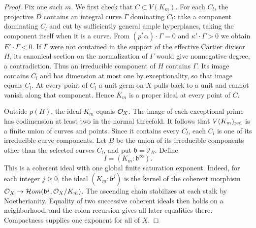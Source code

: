 \begin{proof}
Fix one such \(m\).  We first check that \(C\subset V(K_m)\).
For each \(C_l\), the projective \(D\) contains an integral curve
\(\Gamma\) dominating \(C_l\): take a component dominating \(C_l\)
and cut by sufficiently general ample hyperplanes, taking the component
itself when it is a curve.  From
\((p^*\alpha)\cdot\Gamma=0\) and \(\kappa'\cdot\Gamma>0\) we obtain
\(E'\cdot\Gamma<0\).  If \(\Gamma\) were not contained in the support
of the effective Cartier divisor \(H\), its canonical section on the
normalization of \(\Gamma\) would give nonnegative degree, a contradiction.
Thus an irreducible component of \(H\) contains \(\Gamma\).  Its image
contains \(C_l\) and has dimension at most one by exceptionality, so
that image equals \(C_l\).  At every
point of \(C_l\) a unit germ on \(X\) pulls back to a unit and cannot
vanish along that component.  Hence \(K_m\) is a proper ideal at every
point of \(C\).

Outside \(p(H)\), the ideal \(K_m\) equals \(\mathcal O_X\).  The image of each
exceptional prime has codimension at least two in the normal threefold.
It follows that \(V(K_m)_{\mathrm{red}}\) is a finite union of curves and points.
Since it contains every \(C_l\), each \(C_l\) is one of its irreducible
curve components.
Let \(B\) be the union of its irreducible components other than the
selected curves \(C_l\), and put \(\mathfrak b=\mathcal I_B\).  Define
\[
 I=(K_m:\mathfrak b^\infty).
\]
This is a coherent ideal with one global finite saturation exponent.
Indeed, for each integer \(j\geq0\), the ideal
\((K_m:\mathfrak b^j)\) is the kernel of the coherent
morphism
\(\mathcal O_X\to\mathcal Hom(\mathfrak b^j,\mathcal O_X/K_m)\).
The ascending chain stabilizes at each stalk by Noetherianity.  Equality
of two successive coherent ideals then holds on a neighborhood, and the
colon recursion gives all later equalities there.  Compactness supplies
one exponent for all of \(X\).


\end{proof}
